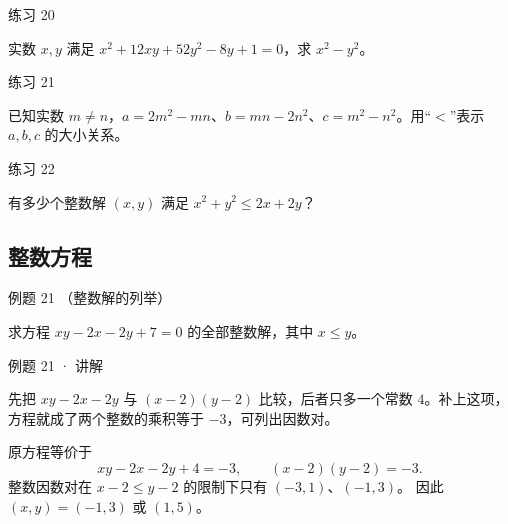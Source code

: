\begin{problem}{练习 20}

实数 $x,y$ 满足 $x^2+12xy+52y^2-8y+1=0$，求 $x^2-y^2$。

\end{problem}

\begin{problem}{练习 21}

已知实数 $m\ne n$，$a=2m^2-mn$、$b=mn-2n^2$、$c=m^2-n^2$。用“$<$”表示 $a,b,c$ 的大小关系。

\end{problem}

\begin{problem}{练习 22}

有多少个整数解 $(x,y)$ 满足 $x^2+y^2\le2x+2y$？

\end{problem}


\subsection{整数方程}



\begin{problem}{例题 21 （整数解的列举）}

求方程 $xy-2x-2y+7=0$ 的全部整数解，其中 $x\le y$。

\end{problem}


\begin{solution}{例题 21 · 讲解}

\think 先把 $xy-2x-2y$ 与 $(x-2)(y-2)$ 比较，后者只多一个常数 $4$。补上这项，方程就成了两个整数的乘积等于 $-3$，可列出因数对。

\solve 原方程等价于
\[xy-2x-2y+4=-3,\qquad (x-2)(y-2)=-3.\]
整数因数对在 $x-2\le y-2$ 的限制下只有 $(-3,1)$、$(-1,3)$。
因此 $(x,y)=(-1,3)$ 或 $(1,5)$。


\end{solution}




